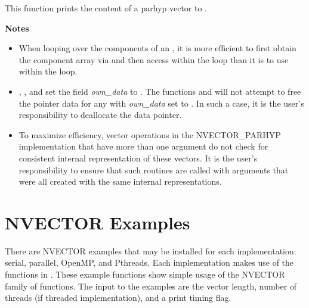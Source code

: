 \documentclass[letterpaper,10pt,english]{sphinxmanual}
\begin{document}

\begin{fulllineitems}
\label{nvectors/NVector_ParHyp:c.N_VPrint_ParHyp}
This function prints the content of a parhyp vector to .

\end{fulllineitems}


\textbf{Notes}
\begin{itemize}
\item {} 
When looping over the components of an , it is more
efficient to first obtain the component array via  and then access  within the loop than it
is to use  within the loop.

\item {} 
{\hyperref[nvectors/NVector_ParHyp:c.N_VNewEmpty_ParHyp]{\emph{}}}, {\hyperref[nvectors/NVector_ParHyp:c.N_VMake_ParHyp]{\emph{}}}, and
{\hyperref[nvectors/NVector_ParHyp:c.N_VCloneEmptyVectorArray_ParHyp]{\emph{}}} set the field \emph{own\_data}
to .  The functions  and
{\hyperref[nvectors/NVector_ParHyp:c.N_VDestroyVectorArray_ParHyp]{\emph{}}} will not attempt to free the
pointer data for any  with \emph{own\_data} set to .
In such a case, it is the user's responsibility to deallocate the
data pointer.

\item {} 
To maximize efficiency, vector operations in the NVECTOR\_PARHYP
implementation that have more than one  argument do not
check for consistent internal representation of these vectors. It is
the user's responsibility to ensure that such routines are called
with  arguments that were all created with the same
internal representations.

\end{itemize}


\section{NVECTOR Examples}
\label{nvectors/NVector_Examples:nvector-examples}\label{nvectors/NVector_Examples::doc}\label{nvectors/NVector_Examples:nvectors-examples}
There are NVECTOR examples that may be installed for each
implementation: serial, parallel, OpenMP, and Pthreads.  Each
implementation makes use of the functions in .
These example functions show simple usage of the NVECTOR family
of functions. The input to the examples are the vector length, number
of threads (if threaded implementation), and a print timing flag.
\end{document}
